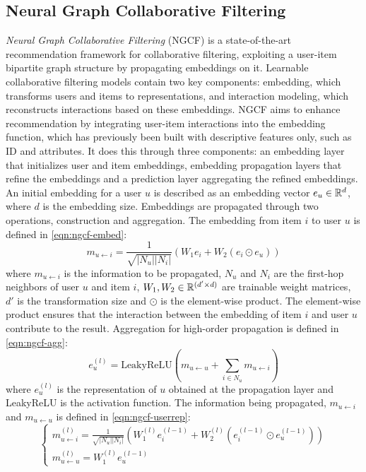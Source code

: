 \subsection{Neural Graph Collaborative Filtering}
\textit{Neural Graph Collaborative Filtering} (NGCF) is a state-of-the-art recommendation framework for collaborative filtering, exploiting a user-item bipartite graph structure by propagating embeddings on it.
Learnable collaborative filtering models contain two key components: embedding, which transforms users and items to representations, and interaction modeling, which reconstructs interactions based on these embeddings.
NGCF aims to enhance recommendation by integrating user-item interactions into the embedding function, which has previously been built with descriptive features only, such as ID and attributes.
It does this through three components: an embedding layer that initializes user and item embeddings, embedding propagation layers that refine the embeddings and a prediction layer aggregating the refined embeddings.
An initial embedding for a user $u$ is described as an embedding vector $e_u \in \mathbb{R}^d$, where $d$ is the embedding size.
Embeddings are propagated through two operations, construction and aggregation.
The embedding from item $i$ to user $u$ is defined in \autoref{eqn:ngcf-embed}:
\begin{equation}\label{eqn:ngcf-embed}
    m_{u \leftarrow i} = \frac{1}{\sqrt{|N_u||N_i|}} (W_1e_i + W_2(e_i \odot e_u))
\end{equation}
where $m_{u \leftarrow i}$ is the information to be propagated, $N_u$ and $N_i$ are the first-hop neighbors of user $u$ and item $i$, $W_1, W_2 \in \mathbb{R}^{(d' \times d)}$ are trainable weight matrices, $d'$ is the transformation size and $\odot$ is the element-wise product.
The element-wise product ensures that the interaction between the embedding of item $i$ and user $u$ contribute to the result.
Aggregation for high-order propagation is defined in \autoref{eqn:ngcf-agg}:
\begin{equation}\label{eqn:ngcf-agg}
    e_{u}^{(l)} = \textrm{LeakyReLU}(m_{u \leftarrow u} + \sum_{i \in N_u} m_{u \leftarrow i})
\end{equation}
where $e_u^{(l)}$ is the representation of $u$ obtained at the propagation layer and LeakyReLU is the activation function.
The information being propagated, $m_{u \leftarrow i}$ and $m_{u \leftarrow u}$  is defined in \autoref{eqn:ngcf-userrep}:
\begin{equation}\label{eqn:ngcf-userrep}
  \begin{cases}
    m_{u \leftarrow i}^{(l)} = \frac{1}{\sqrt{|N_u||N_i|}} (W_1^{(l)} e_i^{(l-1)} + W_2^{(l)} (e_i^{(l-1)} \odot e_u^{(l-1)}))\\
    m_{u \leftarrow u}^{(l)} = W_1^{(l)}e_u^{(l-1)}
  \end{cases}
\end{equation}
